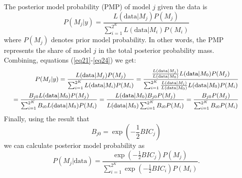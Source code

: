 \documentclass[a4paper]{article}
\begin{document}
The posterior model probability (PMP) of model $j$ given the data is
\begin{equation}\label{eq24}
    P(M_{j}|y)=\frac{L(\text{data}|M_{j})P(M_{j})}{\sum_{i=1}^{2^K}L(\text{data}|M_{i})P(M_{i})}
\end{equation}
where $P(M_{j})$ denotes prior model probability. In other words, the PMP represents the share of model $j$ in the total posterior probability mass. Combining, equations (\ref{eq21}-\ref{eq24}) we get:
\begin{equation}\label{eq25}
\fontsize{9pt}{12pt} \selectfont
\begin{split}
    P(M_{j}|y)=\frac{L(\text{data}|M_{j})P(M_{j})}{\sum_{i=1}^{2^K}L(\text{data}|M_{i})P(M_{i})}
    =\frac{\frac{L(\text{data}|M_{j})}{L(\text{data}|M_{0})}
    L(\text{data}|M_{0})P(M_{j})}{\sum_{i=1}^{2^K}\frac{L(\text{data}|M_{i})}{L(\text{data}|M_{0})}
    L(\text{data}|M_{0})P(M_{i})}\\
    =\frac{B_{j0}L(\text{data}|M_{0})P(M_{j})}{\sum_{i=1}^{2^K}B_{i0}
    L(\text{data}|M_{0})P(M_{i})}
    =\frac{L(\text{data}|M_{0})B_{j0}P(M_{j})}{L(\text{data}|M_{0})\sum_{i=1}^{2^K}B_{i0}P(M_{i})}
    =\frac{B_{j0}P(M_{j})}{\sum_{i=1}^{2^K}B_{i0}P(M_{i})}
\end{split}
\end{equation}
\normalsize
Finally, using the result that
\begin{equation}\label{eq26}
 B_{j0}=\exp{(-\frac{1}{2}BIC_{j})}
\end{equation}
we can calculate posterior model probability as
\begin{equation}\label{eq27}
    P(M_{j}|\text{data})=\frac{\exp{(-\frac{1}{2}BIC_{j})}P(M_{j})}{\sum_{i=1}^{2^K}\exp{(-\frac{1}{2}BIC_{i})} P(M_{i})}.
\end{equation}
\end{document}
